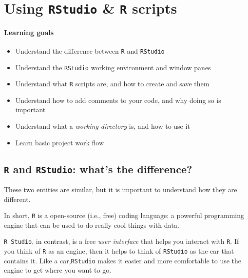 \documentclass[
]{book}
\providecommand{\tightlist}{%
  \setlength{\itemsep}{0pt}\setlength{\parskip}{0pt}}
\begin{document}
~

\chapter{\texorpdfstring{Using \texttt{RStudio} \& \texttt{R} scripts}{Using RStudio \& R scripts}}\label{using-rstudio-r-scripts}

\subsubsection*{Learning goals}\label{learning-goals-2}

\begin{itemize}
\tightlist
\item
  Understand the difference between \texttt{R} and \texttt{RStudio}
\item
  Understand the \texttt{RStudio} working environment and window panes\\
\item
  Understand what \texttt{R} scripts are, and how to create and save them
\item
  Understand how to add comments to your code, and why doing so is important
\item
  Understand what a \emph{working directory} is, and how to use it
\item
  Learn basic project work flow
\end{itemize}

\section*{\texorpdfstring{\texttt{R} and \texttt{RStudio}: what's the difference?}{R and RStudio: what's the difference?}}\label{r-and-rstudio-whats-the-difference}

These two entities are similar, but it is important to understand how they are different.

In short, \texttt{R} is a open-source (i.e., free) coding language: a powerful programming engine that can be used to do really cool things with data.

\texttt{R\ Studio}, in contrast, is a free \emph{user interface} that helps you interact with \texttt{R}. If you think of \texttt{R} as an engine, then it helps to think of \texttt{RStudio} as the car that contains it. Like a car,\texttt{RStudio} makes it easier and more comfortable to use the engine to get where you want to go.
\end{document}
